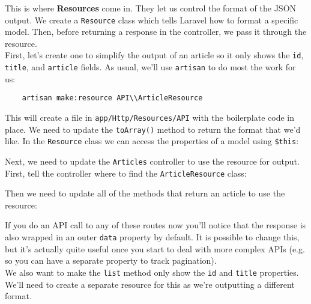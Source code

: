 This is where \textbf{Resources} come in. They let us control the format of the JSON output. We create a \texttt{Resource} class which tells Laravel how to format a specific model. Then, before returning a response in the controller, we pass it through the resource.
\\

First, let's create one to simplify the output of an article so it only shows the \texttt{id}, \texttt{title}, and \texttt{article} fields. As usual, we'll use \texttt{artisan} to do most the work for us:

\begin{verbatim}
    artisan make:resource API\\ArticleResource
\end{verbatim}

This will create a file in \texttt{app/Http/Resources/API} with the boilerplate code in place. We need to update the \texttt{toArray()} method to return the format that we'd like. In the \texttt{Resource} class we can access the properties of a model using \texttt{\$this}:


Next, we need to update the \texttt{Articles} controller to use the resource for output.
\\

First, tell the controller where to find the \texttt{ArticleResource} class:


Then we need to update all of the methods that return an article to use the resource:


If you do an API call to any of these routes now you'll notice that the response is also wrapped in an outer \texttt{data} property by default. It is possible to change this, but it's actually quite useful once you start to deal with more complex APIs (e.g. so you can have a separate property to track pagination).
\\

We also want to make the \texttt{list} method only show the \texttt{id} and \texttt{title} properties. We'll need to create a separate resource for this as we're outputting a different format.
\\


